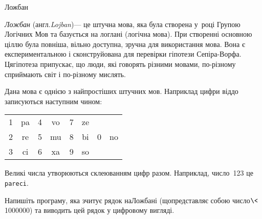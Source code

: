 \begin{problemAllDefault}{Ложбан}

\emph{Ложбан} (англ.\nolinebreak[3] \emph{Lojban})\nolinebreak[3] --- це штучна мова, яка була створена у~році Групою Логічних Мов та базується на логлані (логічна мова). При створенні основною ціллю була повніша, вільно доступна, зручна для використання мова. Вона є експериментальною і сконструйована для перевірки гіпотези Сепіра-Ворфа. Ця\nolinebreak[2] гіпотеза припускає, що люди, які говорять різними мовами, по-різному сприймають світ і по-різному мислять.

Дана мова є однією з найпростіших штучних мов. Наприклад цифри від\nolinebreak[1] до записуються наступним чином:

\vspace{\ifAfour-1.5\baselineskip\else-0.5\baselineskip\fi plus 6pt minus 6pt}

\begin{center}
\begin{ttfamily}
\begin{tabular}{cc@{ ~ ~ ~ }cc@{ ~ ~ ~ }cc@{ ~ ~ ~ }cc}
1 & pa	&	4 & vo	&	7 & ze				\\
2 & re	&	5 & mu	&	8 & bi	&	0 & no	\\
3 & ci	&	6 & xa	&	9 & so				
\end{tabular}
\end{ttfamily}

\end{center}

\vspace{\ifAfour-0.75\baselineskip\else-0.5\baselineskip\fi plus 6pt minus 6pt}

Великі числа утворюються склеюванням цифр разом. Наприклад, число~123 це \texttt{pareci}.

\Task	\hspace{0pt minus 0.5em}Напишіть програму, яка зчитує рядок на\nolinebreak[2] Ложбані (що\nolinebreak[3] представляє собою \mbox{число${}\<{}$1\hspace{0.125em}000\hspace{0.125em}000}) та виводить цей рядок у цифровому вигляді.

\Example
\begin{exampleSimple}{5em}{3em}%
%
\end{exampleSimple}

\end{problemAllDefault}
